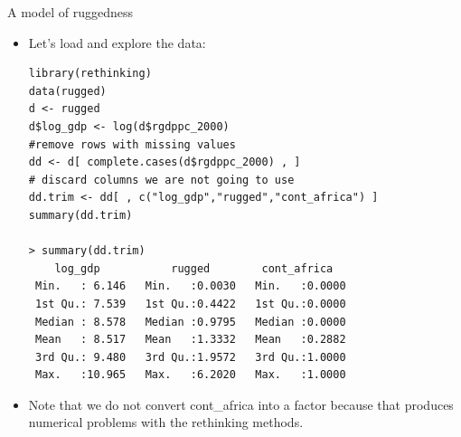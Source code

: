 \documentclass[handout]{beamer}
\begin{document}
\begin{frame}[fragile]{A model of ruggedness}
\scriptsize{

\begin{itemize}
\item Let's load and explore the data:

\begin{verbatim}
library(rethinking)
data(rugged)
d <- rugged
d$log_gdp <- log(d$rgdppc_2000)
#remove rows with missing values
dd <- d[ complete.cases(d$rgdppc_2000) , ]
# discard columns we are not going to use
dd.trim <- dd[ , c("log_gdp","rugged","cont_africa") ]
summary(dd.trim)

> summary(dd.trim)
    log_gdp           rugged        cont_africa    
 Min.   : 6.146   Min.   :0.0030   Min.   :0.0000  
 1st Qu.: 7.539   1st Qu.:0.4422   1st Qu.:0.0000  
 Median : 8.578   Median :0.9795   Median :0.0000  
 Mean   : 8.517   Mean   :1.3332   Mean   :0.2882  
 3rd Qu.: 9.480   3rd Qu.:1.9572   3rd Qu.:1.0000  
 Max.   :10.965   Max.   :6.2020   Max.   :1.0000 
\end{verbatim}

\item Note that we do not convert cont\_africa into a factor because that produces numerical problems with the rethinking methods.

\end{itemize}




} 
\end{frame}
\end{document}
